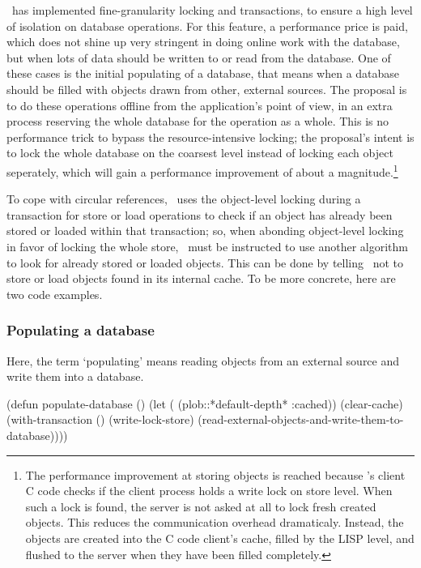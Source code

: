 \plob\ has implemented fine-granularity locking and transactions, to
ensure a high level of isolation on database operations. For this
feature, a performance price is paid, which does not shine up very
stringent in doing online work with the database, but when lots of
data should be written to or read from the database. One of these
cases is the initial populating of a database, that means when a
database should be filled with objects drawn from other, external
sources. The proposal is to do these operations offline from the
application's point of view, in an extra process reserving the whole
database for the operation as a whole. This is no performance trick to
bypass the resource-intensive locking; the proposal's intent is to
lock the whole database on the coarsest level instead of locking each
object seperately, which will gain a performance improvement of about
a magnitude.\footnote{The performance improvement at storing objects
  is reached because \plobwoexcl's client C code checks if the client
  process holds a write lock on store level. When such a lock is
  found, the server is not asked at all to lock fresh created objects.
  This reduces the communication overhead dramaticaly. Instead, the
  objects are created into the C code client's cache, filled by the
  LISP level, and flushed to the server when they have been filled
  completely.}

To cope with circular references, \plob\ uses the object-level locking
during a transaction for store or load operations to check if an
object has already been stored or loaded within that transaction; so,
when abonding object-level locking in favor of locking the whole
store, \plob\ must be instructed to use another algorithm to look for
already stored or loaded objects. This can be done by telling \plob\ 
not to store or load objects found in its internal cache.  To be more
concrete, here are two code examples.

\subsubsection{Populating a database}

Here, the term `populating' means reading objects from an external
source and write them into a database.

\begin{IndentedCompactCode}
(defun populate-database ()
  (let (
        (plob::*default-depth* :cached))
    (clear-cache) 
    (with-transaction ()
      (write-lock-store)
      (read-external-objects-and-write-them-to-database))))
\end{IndentedCompactCode}


